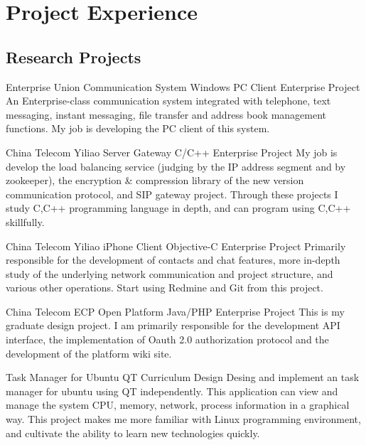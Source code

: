 \documentclass[11pt,a4paper]{moderncv}
\begin{document}
\section{Project Experience}
\subsection{Research Projects}
{Enterprise Union Communication System}
{Windows PC Client}
{Enterprise Project}{}
{
An Enterprise-class communication system integrated with telephone, text messaging, instant messaging,
file transfer and address book management functions. My job is developing the PC client of this system.
}

\vspace*{0.2\baselineskip}
{China Telecom Yiliao Server Gateway}
{C/C++}
{Enterprise Project}{}
{
My job is develop the load balancing service (judging by the IP address segment and by zookeeper), 
the encryption \& compression library of the new version communication protocol, and SIP gateway project.
Through these projects I study  C,C++ programming language in depth, and can program using C,C++ skillfully.
}

\vspace*{0.2\baselineskip}
{China Telecom Yiliao iPhone Client}
{Objective-C}
{Enterprise Project}{}
{
Primarily responsible for the development of contacts and chat features, more in-depth study of the underlying network communication and project structure,
and various other operations. Start using Redmine and Git from this project.
}

\vspace*{0.2\baselineskip}
{China Telecom ECP Open Platform}
{Java/PHP}
{Enterprise Project}{}
{
This is my graduate design project. I am primarily responsible for the development API interface, the implementation of Oauth 2.0 authorization protocol
and the development of the platform wiki site.
}

\vspace*{0.2\baselineskip}
{Task Manager for Ubuntu}
{QT}
{Curriculum Design}{}
{
Desing and implement an task manager for ubuntu using QT independently. This application can view and manage
the system CPU, memory, network, process information  in a graphical way. This project makes me more familiar
with Linux programming environment, and cultivate the ability to learn new technologies quickly.
}
\end{document}
